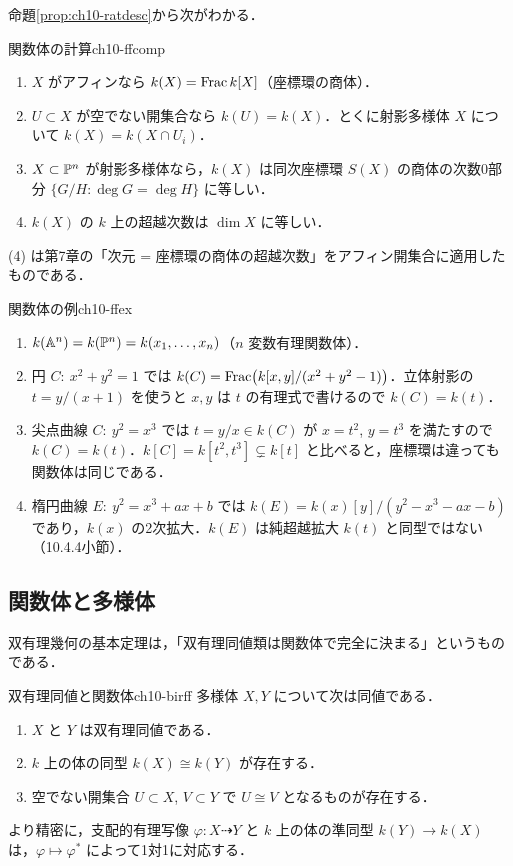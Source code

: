 命題\ref{prop:ch10-ratdesc}から次がわかる．

\begin{myprop}{関数体の計算}{ch10-ffcomp}
\begin{enumerate}
  \item $X$ がアフィンなら $k(X)=\operatorname{Frac} k[X]$（座標環の商体）．
  \item $U\subset X$ が空でない開集合なら $k(U)=k(X)$．とくに射影多様体 $X$ について $k(X)=k(X\cap U_i)$．
  \item $X\subset\mathbb{P}^n$ が射影多様体なら，$k(X)$ は同次座標環 $S(X)$ の商体の次数0部分 $\{G/H:\deg G=\deg H\}$ に等しい．
  \item $k(X)$ の $k$ 上の超越次数は $\dim X$ に等しい．
\end{enumerate}
\end{myprop}

(4) は第7章の「次元 = 座標環の商体の超越次数」をアフィン開集合に適用したものである．

\begin{myex}{関数体の例}{ch10-ffex}
\begin{enumerate}
  \item $k(\mathbb{A}^n)=k(\mathbb{P}^n)=k(x_1,\dots,x_n)$（$n$ 変数有理関数体）．
  \item 円 $C:\ x^2+y^2=1$ では $k(C)=\operatorname{Frac}\bigl(k[x,y]/(x^2+y^2-1)\bigr)$．立体射影の $t=y/(x+1)$ を使うと $x,y$ は $t$ の有理式で書けるので $k(C)=k(t)$．
  \item 尖点曲線 $C:\ y^2=x^3$ では $t=y/x\in k(C)$ が $x=t^2$, $y=t^3$ を満たすので $k(C)=k(t)$．$k[C]=k[t^2,t^3]\subsetneq k[t]$ と比べると，座標環は違っても関数体は同じである．
  \item 楕円曲線 $E:\ y^2=x^3+ax+b$ では $k(E)=k(x)[y]/(y^2-x^3-ax-b)$ であり，$k(x)$ の2次拡大．$k(E)$ は純超越拡大 $k(t)$ と同型ではない（10.4.4小節）．
\end{enumerate}
\end{myex}

\subsection{関数体と多様体}

双有理幾何の基本定理は，「双有理同値類は関数体で完全に決まる」というものである．

\begin{mythm}{双有理同値と関数体}{ch10-birff}
多様体 $X,Y$ について次は同値である．
\begin{enumerate}
  \item $X$ と $Y$ は双有理同値である．
  \item $k$ 上の体の同型 $k(X)\cong k(Y)$ が存在する．
  \item 空でない開集合 $U\subset X$, $V\subset Y$ で $U\cong V$ となるものが存在する．
\end{enumerate}
より精密に，支配的有理写像 $\varphi:X\dashrightarrow Y$ と $k$ 上の体の準同型 $k(Y)\to k(X)$ は，$\varphi\mapsto\varphi^*$ によって1対1に対応する．
\end{mythm}

